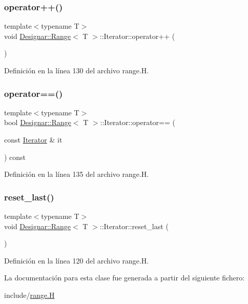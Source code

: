 \subsubsection{\texorpdfstring{operator++()}{operator++()}}
{\footnotesize\ttfamily template$<$typename T$>$ \\
void \hyperlink{class_designar_1_1_range}{Designar\+::\+Range}$<$ T $>$\+::Iterator\+::operator++ (\begin{DoxyParamCaption}{ }\end{DoxyParamCaption})\hspace{0.3cm}{\ttfamily [inline]}}



Definición en la línea 130 del archivo range.\+H.

\mbox{\label{class_designar_1_1_range_1_1_iterator_a0c3ce6ecdc451e8f8f91d114485abb2b}} 
\subsubsection{\texorpdfstring{operator==()}{operator==()}}
{\footnotesize\ttfamily template$<$typename T$>$ \\
bool \hyperlink{class_designar_1_1_range}{Designar\+::\+Range}$<$ T $>$\+::Iterator\+::operator== (\begin{DoxyParamCaption}\item[{const \hyperlink{class_designar_1_1_range_1_1_iterator}{Iterator} \&}]{it }\end{DoxyParamCaption}) const\hspace{0.3cm}{\ttfamily [inline]}}



Definición en la línea 135 del archivo range.\+H.

\mbox{\label{class_designar_1_1_range_1_1_iterator_ae5a8045527f0582b9a0f126ccf50ae19}} 
\subsubsection{\texorpdfstring{reset\+\_\+last()}{reset\_last()}}
{\footnotesize\ttfamily template$<$typename T$>$ \\
void \hyperlink{class_designar_1_1_range}{Designar\+::\+Range}$<$ T $>$\+::Iterator\+::reset\+\_\+last (\begin{DoxyParamCaption}{ }\end{DoxyParamCaption})\hspace{0.3cm}{\ttfamily [inline]}}



Definición en la línea 120 del archivo range.\+H.



La documentación para esta clase fue generada a partir del siguiente fichero\+:\begin{DoxyCompactItemize}
\item 
include/\hyperlink{range_8_h}{range.\+H}\end{DoxyCompactItemize}
